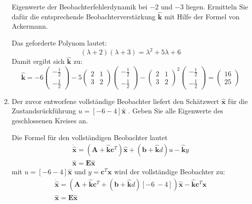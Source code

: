 \documentclass[crop=false]{standalone}
\begin{document}
\begin{task}
\begin{enumerate}[i]
Eigenwerte der Beobachterfehlerdynamik bei $-2$ und $-3$ liegen. Ermitteln Sie dafür
die entsprechende Beobachterverstärkung $\hat{\mathbf{k}}$ mit Hilfe der Formel von Ackermann.
 \begin{solution}
 Das geforderte Polynom lautet:
 \[(\lambda +2)(\lambda +3) = \lambda^2 + 5 \lambda + 6\]
 Damit ergibt sich $\hat{\mathbf{k}}$ zu:
 \[ \hat{\mathbf{k}} = -6 \begin{pmatrix}-\frac{1}{2} \\ -\frac{1}{2}\end{pmatrix} - 5 \begin{pmatrix}2 & 1\\3 & 2\end{pmatrix}\begin{pmatrix}-\frac{1}{2} \\ -\frac{1}{2}\end{pmatrix} - \begin{pmatrix}2 & 1\\3 & 2\end{pmatrix}^2\begin{pmatrix}-\frac{1}{2} \\ -\frac{1}{2}\end{pmatrix} = \begin{pmatrix}16 \\ 25\end{pmatrix}\]
 \end{solution}
 \item Der zuvor entworfene vollständige Beobachter liefert den Schätzwert
$\hat{\mathbf{x}}$ für die Zustandsrückführung $u=[-6-4] \hat{\mathbf{x}}$ . Geben Sie alle Eigenwerte des
geschlossenen Kreises an.
\begin{solution}
Die Formel für den vollständigen Beobachter lautet
 \[ 
\begin{array}{l}{\dot{\hat{\mathbf{x}}}=\left(\mathbf{A}+\hat{\mathbf{k}} \mathbf{c}^{T}\right) \hat{\mathbf{x}}+(\mathbf{b}+\hat{\mathbf{k}} d) u-\hat{\mathbf{k}} y} \\ {\hat{\mathbf{x}}=\mathbf{E} \hat{\mathbf{x}}}\end{array}
 \]
 mit $u=[-6 -4] \hat{\mathbf{x}}$ und $y = \mathbf{c}^T \mathbf{x}$ wird der vollständige Beobachter zu:
 \[ 
\begin{array}{l}{\dot{\hat{\mathbf{x}}}=\left(\mathbf{A}+\hat{\mathbf{k}}\mathbf{c}^T+(\mathbf{b}+\hat{\mathbf{k}} d) [-6 \ -4] \right) \hat{\mathbf{x}}-\hat{\mathbf{k}} \mathbf{c}^T \mathbf{x}} \\ {\hat{\mathbf{x}}=\mathbf{E} \hat{\mathbf{x}}}\end{array}
\]
\end{solution}
\end{enumerate}
\end{task}
\end{document}
